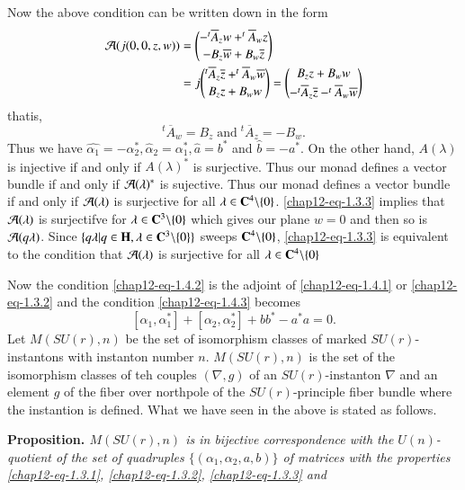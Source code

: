 Now the above condition can be written down in the form
\begin{align*}
\mathcal{A}(j(0,0,z,w)) &= \binom{-^{t}\overline{A}_{z}w +^{t}\overline{A}_{w}z}{-B_{z}\overline{w}+B_{w}\overline{z}}\\
 &= j \binom{^{t}\overline{A}_{z}\overline{z} +^{t}\overline{A}_{w}\overline{w}}{B_{z}z+B_{w}w} = \binom{B_{z}z+B_{w}w}{-^{t}\overline{A}_{z}\overline{z}-^{t}\overline{A}_{w}\overline{w}}\\
\end{align*}
that\pageoriginale is,
$$
^{t}\overline{A}_{w} = B_{z}\; \text{and} \; ^{t}\overline{A}_{z}= -B_{w}. 
$$
Thus we have $\hat{\alpha_{1}} = -\alpha_{2}^{*}, \hat{\alpha}_{2} = \alpha_{1}^{*}, \hat{a}=b^{*}$ and $\hat{b} = -a^{*}$. On the other hand, $A(\lambda)$ is injective if and only if $A(\lambda)^{*}$ is surjective. Thus our monad defines a vector bundle if and only if $\mathcal{A}(\lambda)^{*}$ is sujective. Thus our monad defines a vector bundle if and  only if $\mathcal{A}(\lambda)$ is surjective for all $\lambda \in \mathbf{C}^{4}\backslash \{0\}$. \eqref{chap12-eq-1.3.3} implies that $\mathcal{A}(\lambda)$ is surjectifve for $\lambda \in \mathbf{C}^{3}\backslash\{0\}$ which gives our plane $w=0$ and then so is $\mathcal{A}(q \lambda)$. Since $\{q \lambda | q \in \mathbf{H}, \lambda \in \mathbf{C}^{3} \backslash\{0\}\}$ sweeps $\mathbf{C}^{4} \backslash \{0\}$, \eqref{chap12-eq-1.3.3} is equivalent to the condition that $\mathcal{A}(\lambda)$ is surjective for all $\lambda \in \mathbf{C}^{4}\backslash\{0\}$ 

Now the condition \eqref{chap12-eq-1.4.2} is the adjoint of \eqref{chap12-eq-1.4.1} or \eqref{chap12-eq-1.3.2} and the condition \eqref{chap12-eq-1.4.3} becomes
$$
[\alpha_{1}, \alpha_{1}^{*}] + [\alpha_{2}, \alpha_{2}^{*}] + bb^{*}-a^{*}a=0.
$$
 Let $M(SU(r), n)$ be the set of isomorphism classes of marked $SU(r)$-instantons with instanton number $n$. $M(SU(r), n)$ is the set of the isomorphism classes of teh couples $(\nabla, g)$ of an $SU(r)$-instanton $\nabla$ and an element $g$ of the fiber over northpole of the $SU(r)$-principle fiber bundle where the instantion is defined. What we have seen in the above is stated as follows.
  
\medskip
\noindent
{\bfseries {} Proposition. \label{chap12-prop-1.6}}\textit{$M(SU(r),n)$ is in bijective correspondence with the $U(n)$-quotient of the set of quadruples $\{(\alpha_{1}, \alpha_{2},a,b)\}$ of matrices with the properties
\eqref{chap12-eq-1.3.1}, \eqref{chap12-eq-1.3.2}, \eqref{chap12-eq-1.3.3} and}

